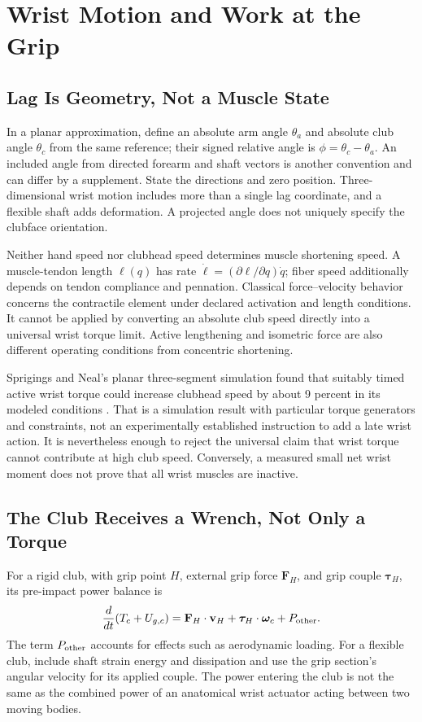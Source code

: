 \section{Wrist Motion and Work at the Grip}
\subsection{Lag Is Geometry, Not a Muscle State}
In a planar approximation, define an absolute arm angle $\theta_a$ and absolute club angle $\theta_c$ from the same reference; their signed relative angle is $\phi=\theta_c-\theta_a$. An included angle from directed forearm and shaft vectors is another convention and can differ by a supplement. State the directions and zero position. Three-dimensional wrist motion includes more than a single lag coordinate, and a flexible shaft adds deformation. A projected angle does not uniquely specify the clubface orientation.

Neither hand speed nor clubhead speed determines muscle shortening speed. A muscle-tendon length $\ell(q)$ has rate $\dot\ell=(\partial\ell/\partial q)\dot q$; fiber speed additionally depends on tendon compliance and pennation. Classical force--velocity behavior concerns the contractile element under declared activation and length conditions. It cannot be applied by converting an absolute club speed directly into a universal wrist torque limit. Active lengthening and isometric force are also different operating conditions from concentric shortening.

Sprigings and Neal's planar three-segment simulation found that suitably timed active wrist torque could increase clubhead speed by about 9 percent in its modeled conditions \citep{SprigingsNeal2000}. That is a simulation result with particular torque generators and constraints, not an experimentally established instruction to add a late wrist action. It is nevertheless enough to reject the universal claim that wrist torque cannot contribute at high club speed. Conversely, a measured small net wrist moment does not prove that all wrist muscles are inactive.

\subsection{The Club Receives a Wrench, Not Only a Torque}
For a rigid club, with grip point $H$, external grip force $\mathbf F_H$, and grip couple $\boldsymbol\tau_H$, its pre-impact power balance is
\begin{equation}
\frac{d}{dt}(T_c+U_{g,c})=
\mathbf F_H\cdot\mathbf v_H+\boldsymbol\tau_H\cdot\boldsymbol\omega_c+P_{\rm other}.
\end{equation}
The term $P_{\rm other}$ accounts for effects such as aerodynamic loading. For a flexible club, include shaft strain energy and dissipation and use the grip section's angular velocity for its applied couple. The power entering the club is not the same as the combined power of an anatomical wrist actuator acting between two moving bodies.

